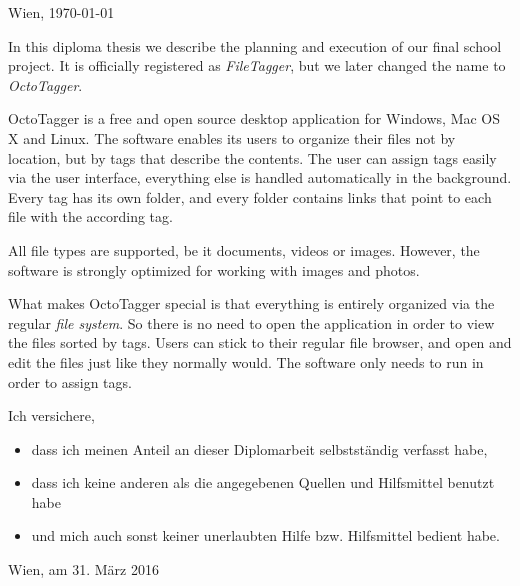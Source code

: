 \documentclass[12pt,a4paper,naustrian,english,oneside,openright,DIV=12,BCOR=1cm]{scrbook}
\begin{document}
\begin{titlepage}
\begin{center}
\vspace{5mm}
Wien, \today
\par\end{center}

\end{titlepage}%


\thispagestyle{fancy}
In this diploma thesis we describe the planning and execution of our final
school project. It is officially registered as \textit{FileTagger}, but we later changed the name to \textit{OctoTagger}.

OctoTagger is a free and open source desktop application for Windows, Mac OS X and Linux. The
software enables its users to organize their files not by location, but by tags
that describe the contents. The user can assign tags easily via the user
interface, everything else is handled automatically in the background. Every tag has its own folder, and every folder contains links that point to each file with
the according tag.

All file types are supported, be it documents, videos or images. However,
the software is strongly optimized for working with images and photos.

What makes OctoTagger special is that everything is entirely organized via the regular \emph{file system}. So there is no need to open the
application in order to view the files sorted by tags. Users can stick to their regular file browser, and open and edit the files just like they normally would. The software only needs to run in order to assign tags.


\thispagestyle{fancy}

Ich versichere,
\begin{itemize}
\item dass ich meinen Anteil an dieser Diplomarbeit selbstständig verfasst
habe,
\item dass ich keine anderen als die angegebenen Quellen und Hilfsmittel
benutzt habe
\item und mich auch sonst keiner unerlaubten Hilfe bzw. Hilfsmittel bedient
habe.
\end{itemize}
\bigskip{}
Wien, am 31. März 2016 %
\end{document}
